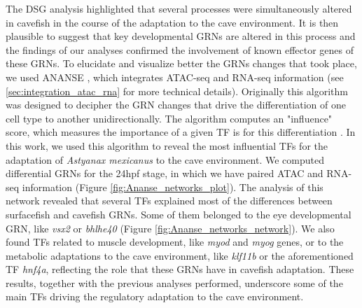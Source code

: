 The DSG analysis highlighted that several processes were simultaneously altered in cavefish in the course of the adaptation to the cave environment. It is then plausible to suggest that key developmental GRNs are altered in this process and the findings of our analyses confirmed the involvement of known effector genes of these GRNs. To elucidate and visualize better the GRNs changes that took place, we used ANANSE \parencite{xu_ananse_2021}, which integrates ATAC-seq and RNA-seq information (see \ref{sec:integration_atac_rna} for more technical details). Originally this algorithm was designed to decipher the GRN changes that drive the differentiation of one cell type to another unidirectionally. The algorithm computes an "influence" score, which measures the importance of a given TF is for this differentiation \parencite{xu_ananse_2021}. In this work, we used this algorithm to reveal the most influential TFs for the adaptation of \textit{Astyanax mexicanus} to the cave environment. We computed differential GRNs for the 24hpf stage, in which we have paired ATAC and RNA-seq information (Figure \ref{fig:Ananse_networks_plot}). The analysis of this network revealed that several TFs explained most of the differences between surfacefish and cavefish GRNs. Some of them belonged to the eye developmental GRN, like \textit{vsx2} or \textit{bhlhe40} (Figure \ref{fig:Ananse_networks_network}). We also found TFs related to muscle development, like \textit{myod} and \textit{myog} genes, or to the metabolic adaptations to the cave environment, like \textit{klf11b} or the aforementioned TF \textit{hnf4a}, reflecting the role that these GRNs have in cavefish adaptation. These results, together with the previous analyses performed, underscore some of the main TFs driving the regulatory adaptation to the cave environment.





